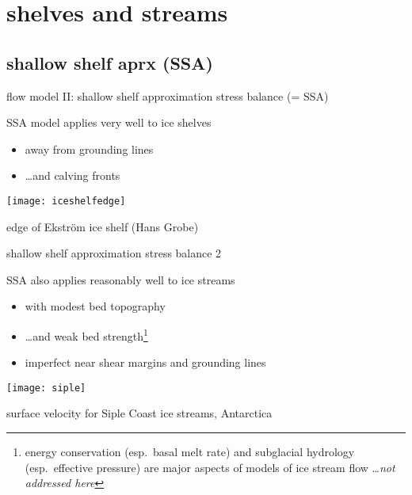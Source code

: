 
\section{shelves and streams}


\subsection{shallow shelf aprx (SSA)}

\begin{frame}{flow model II: shallow shelf approximation stress balance (= SSA)}

SSA model applies very well to \alert{ice shelves}
\begin{itemize}
\item away from grounding lines
\item \dots and calving fronts
\end{itemize}

\bigskip\bigskip

\begin{center}
  \texttt{[image: iceshelfedge]}

\tiny edge of Ekstr\"om ice shelf (Hans Grobe)
\end{center}
\end{frame}


\begin{frame}{shallow shelf approximation stress balance 2}

SSA also applies reasonably well to \alert{ice streams}
\begin{itemize}
\item with modest bed topography
\item \dots and weak bed strength\footnote{energy conservation (esp.~basal melt rate) and subglacial hydrology (esp.~effective pressure) are major aspects of models of ice stream flow \dots \emph{not addressed here}}
\item imperfect near shear margins and grounding lines
\end{itemize}

\begin{center}
  \texttt{[image: siple]}

\tiny surface velocity for Siple Coast ice streams, Antarctica 
\end{center}
\end{frame}



